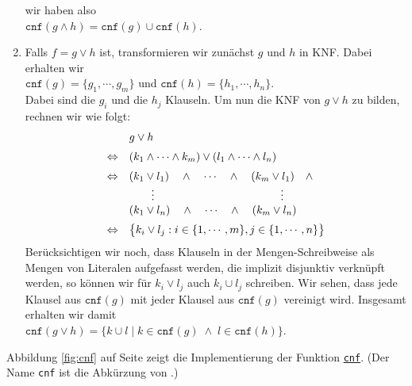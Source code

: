\begin{enumerate}
      wir haben also \\[0.2cm]
      \hspace*{1.3cm} $\texttt{cnf}(g \wedge h) = \texttt{cnf}(g) \cup  \texttt{cnf}(h)$.
\item Falls $f = g \vee h$ ist, transformieren wir zunächst $g$ und $h$ in KNF.
      Dabei erhalten wir \\[0.2cm]
      \hspace*{1.3cm} 
      $\texttt{cnf}(g) = \{ g_1, \cdots, g_m \}$ \quad und \quad
      $\texttt{cnf}(h) = \{ h_1, \cdots, h_n \}$. \\[0.2cm]
      Dabei sind die $g_i$ und die $h_j$ Klauseln.  Um nun die KNF von $g \vee h$ zu
      bilden, rechnen wir wie folgt: 
      $$
      \begin{array}[c]{ll}
        & g \vee h  \\[0.2cm]
      \Leftrightarrow & (k_1 \wedge \cdots \wedge k_m) \vee (l_1 \wedge \cdots \wedge l_n) \\[0.2cm]
      \Leftrightarrow & (k_1 \vee l_1) \quad \wedge \quad \cdots \quad \wedge \quad (k_m \vee l_1) \quad \wedge \\ 
                      & \qquad \vdots     \hspace*{4cm} \vdots                \\
                      & (k_1 \vee l_n) \quad \wedge \quad \cdots \quad \wedge \quad (k_m \vee l_n) \\[0.2cm] 
      \Leftrightarrow & \bigl\{ k_i \vee l_j : i \in \{ 1, \cdots, m\}, j \in \{ 1, \cdots, n \} \bigr\} \\ 
      \end{array}
      $$
      Berücksichtigen wir noch, dass Klauseln in der Mengen-Schreibweise als Mengen von
      Literalen aufgefasst werden, die implizit disjunktiv verknüpft werden, so können wir
      für $k_i \vee l_j$ auch $k_i \cup l_j$ schreiben.  Wir sehen, dass jede Klausel aus $\texttt{cnf}(g)$
      mit jeder Klausel aus $\texttt{cnf}(g)$ vereinigt wird.  Insgesamt erhalten wir damit 
      \\[0.2cm]
      \hspace*{1.3cm} 
      $\texttt{cnf}(g \vee h) = \bigl\{ k \cup l \mid k \in \texttt{cnf}(g) \;\wedge\; l \in \texttt{cnf}(h) \bigr\}$.
\end{enumerate}
Abbildung \ref{fig:cnf} auf Seite \pageref{fig:cnf} zeigt die Implementierung der Funktion
\href{https://github.com/karlstroetmann/Logic/blob/master/Python/CNF.ipynb}{\texttt{cnf}}.
(Der Name \texttt{cnf} ist die Abkürzung von .)

